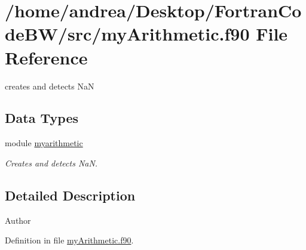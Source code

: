 \hypertarget{my_arithmetic_8f90}{\section{/home/andrea/\-Desktop/\-Fortran\-Code\-B\-W/src/my\-Arithmetic.f90 File Reference}
\label{my_arithmetic_8f90}
}


creates and detects Na\-N  


\subsection*{Data Types}
\begin{DoxyCompactItemize}
\item 
module \hyperlink{classmyarithmetic}{myarithmetic}
\begin{DoxyCompactList}\small\item\em Creates and detects Na\-N. \end{DoxyCompactList}\end{DoxyCompactItemize}


\subsection{Detailed Description}
\begin{DoxyAuthor}{Author}

\end{DoxyAuthor}


Definition in file \hyperlink{my_arithmetic_8f90_source}{my\-Arithmetic.\-f90}.

